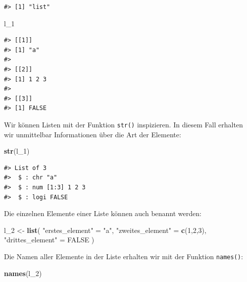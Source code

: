 \documentclass[]{book}
\newenvironment{Shaded}{\begin{snugshade}}{\end{snugshade}}
\newcommand{\KeywordTok}[1]{\textcolor[rgb]{0.13,0.29,0.53}{\textbf{#1}}}
\newcommand{\DecValTok}[1]{\textcolor[rgb]{0.00,0.00,0.81}{#1}}
\newcommand{\StringTok}[1]{\textcolor[rgb]{0.31,0.60,0.02}{#1}}
\newcommand{\OtherTok}[1]{\textcolor[rgb]{0.56,0.35,0.01}{#1}}
\newcommand{\NormalTok}[1]{#1}
\begin{document}
\begin{verbatim}
#> [1] "list"
\end{verbatim}

\begin{Shaded}
\begin{Highlighting}[]
\NormalTok{l_}\DecValTok{1}
\end{Highlighting}
\end{Shaded}

\begin{verbatim}
#> [[1]]
#> [1] "a"
#> 
#> [[2]]
#> [1] 1 2 3
#> 
#> [[3]]
#> [1] FALSE
\end{verbatim}

Wir können Listen mit der Funktion \texttt{str()} inspizieren. In diesem
Fall erhalten wir unmittelbar Informationen über die Art der Elemente:

\begin{Shaded}
\begin{Highlighting}[]
\KeywordTok{str}\NormalTok{(l_}\DecValTok{1}\NormalTok{)}
\end{Highlighting}
\end{Shaded}

\begin{verbatim}
#> List of 3
#>  $ : chr "a"
#>  $ : num [1:3] 1 2 3
#>  $ : logi FALSE
\end{verbatim}

Die einzelnen Elemente einer Liste können auch benannt werden:

\begin{Shaded}
\begin{Highlighting}[]
\NormalTok{l_}\DecValTok{2}\NormalTok{ <-}\StringTok{ }\KeywordTok{list}\NormalTok{(}
  \StringTok{"erstes_element"}\NormalTok{ =}\StringTok{ "a"}\NormalTok{,}
  \StringTok{"zweites_element"}\NormalTok{ =}\StringTok{ }\KeywordTok{c}\NormalTok{(}\DecValTok{1}\NormalTok{,}\DecValTok{2}\NormalTok{,}\DecValTok{3}\NormalTok{),}
  \StringTok{"drittes_element"}\NormalTok{ =}\StringTok{ }\OtherTok{FALSE}
\NormalTok{)}
\end{Highlighting}
\end{Shaded}

Die Namen aller Elemente in der Liste erhalten wir mit der Funktion
\texttt{names()}:

\begin{Shaded}
\begin{Highlighting}[]
\KeywordTok{names}\NormalTok{(l_}\DecValTok{2}\NormalTok{)}
\end{Highlighting}
\end{Shaded}
\end{document}
